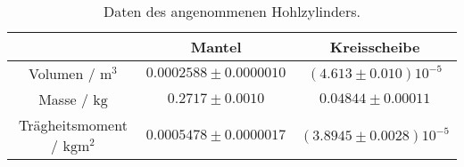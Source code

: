 \begin{table}[h]
	\centering
	\begin{tabular}{ccc}
	\toprule
	&{Mantel}&{Kreisscheibe}\\
	\midrule
{Volumen / $\si{\meter\cubed}$}&$0.0002588\pm0.0000010$&$(4.613\pm0.010)10^{-5}$\\
{Masse / $\si{\kilo\gram}$}&$0.2717\pm0.0010$&$0.04844\pm0.00011$\\
{Trägheitsmoment / $\si{\kilo\gram\meter\squared}$}&$0.0005478\pm0.0000017$&$(3.8945\pm0.0028)10^{-5}$\\
	\bottomrule
	\end{tabular}
	\caption{Daten des angenommenen Hohlzylinders.}
	\label{tab:M3 I_Z}
\end{table}

